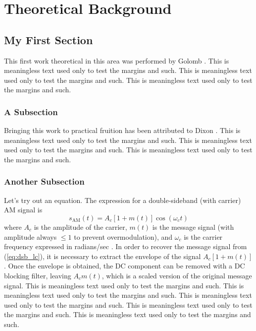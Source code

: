 
\chapter{Theoretical Background}

\section{My First Section}

This first work theoretical in this area was performed by Golomb
\cite{Golomb82}. This is meaningless text used only to test the
margins and such. This is meaningless text used only to test the
margins and such. This is meaningless text used only to test the
margins and such.
\subsection{A Subsection}
Bringing this work to practical fruition has been attributed to
Dixon \cite{Dixon94}. This is meaningless text used only to test
the margins and such. This is meaningless text used only to test
the margins and such. This is meaningless text used only to test
the margins and such. 
\subsection{Another Subsection}
Let's try out an equation. The expression for a double-sideband
(with carrier) AM signal is
\begin{equation}
s_{\mathrm{AM}}(t)=A_c[1+m(t)]\cos(\omega_c t) \label{eq:dsb_lc}
\end{equation}
where $A_c$ is the amplitude of the carrier, $m(t)$ is the message
signal (with amplitude always $\le 1$ to prevent overmodulation),
and $\omega_c$ is the carrier frequency expressed in radians/sec
\cite{Couch01}. In order to recover the message signal from
(\ref{eq:dsb_lc}), it is necessary to extract the envelope of the
signal $A_c[1+m(t)]$. Once the envelope is obtained, the DC
component can be removed with a DC blocking filter, leaving $A_c
m(t)$, which is a scaled version of the original message signal.
This is meaningless text used only to test the margins and such.
This is meaningless text used only to test the margins and such.
This is meaningless text used only to test the margins and such.
This is meaningless text used only to test the margins and such.
This is meaningless text used only to test the margins and such.

